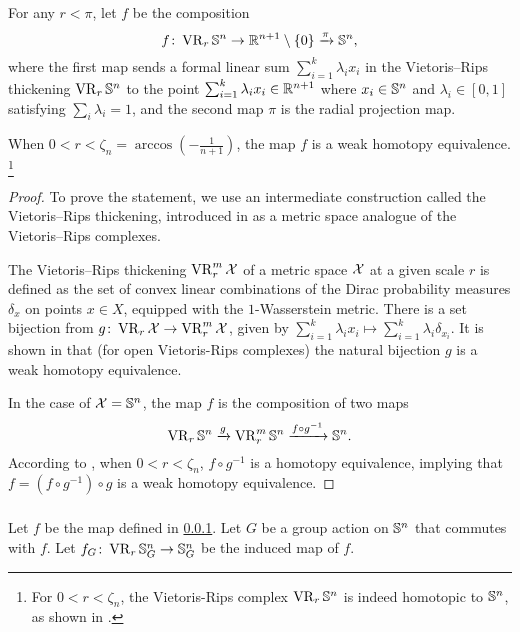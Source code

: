 \subsubsection{}
\label{subsub:f}

For any $r<\pi$, let $f$ be the composition
\[
    f \colon \operatorname{VR}_r\mathbb{S}^n \to \mathbb{R}^{n+1} \setminus \{0\} \xrightarrow{\pi} \mathbb{S}^n,
\]
where the first map sends a formal linear sum $\sum_{i=1}^k \lambda_i x_i$ in the Vietoris--Rips thickening $\operatorname{VR}_r\mathbb{S}^n$ to the point $\sum_{i=1}^k \lambda_i x_i \in \mathbb{R}^{n+1}$ where $x_i \in \mathbb{S}^n$ and $\lambda_i \in [0,1]$ satisfying $\sum_i\lambda_i=1$, and the second map $\pi$ is the radial projection map.

\medskip\lemma
When $0<r<\zeta_n=\arccos{(-\tfrac{1}{n+1})}$, the map $f$ is a weak homotopy equivalence.
\footnote{For $0<r<\zeta_n$, the Vietoris-Rips complex $\operatorname{VR}_r\mathbb{S}^n$ is indeed homotopic to $\mathbb{S}^n$, as shown in \cite[Theorem 7.1]{lim2020vietoris}.}

\begin{proof}
        To prove the statement, we use an intermediate construction called the Vietoris--Rips thickening, introduced in \cite{adamaszek2018metric} as a metric space analogue of the Vietoris--Rips complexes.
        
        The Vietoris--Rips thickening $\operatorname{VR}_r^m\mathcal{X}$ of a metric space $\mathcal{X}$ at a given scale $r$ is defined as the set of convex linear combinations of the Dirac probability measures $\delta_{x}$ on points $x \in X$, equipped with the $1$-Wasserstein metric. 
        There is a set bijection from $g \colon \operatorname{VR}_r\mathcal{X} \to \operatorname{VR}_r^m\mathcal{X}$, given by $\sum_{i=1}^k\lambda_i x_i\mapsto \sum_{i=1}^k\lambda_i\delta_{x_i}.$ 
        It is shown in \cite[Theorem 1]{gillespie2024vietoris} that (for open Vietoris-Rips complexes) the natural bijection $g$ is a weak homotopy equivalence.

        In the case of $\mathcal{X} = \mathbb{S}^n$, the map $f$ is the composition of two maps
        \[\operatorname{VR}_r\mathbb{S}^n\xrightarrow{g}\operatorname{VR}_r^m\mathbb{S}^n\xrightarrow{f \circ g^{-1}}\mathbb{S}^n.\]
        According to \cite[Proposition 5.3]{adamaszek2018metric}, when $0<r<\zeta_n$, $f \circ g^{-1}$ is a homotopy equivalence, implying that $f = (f \circ g^{-1}) \circ g$ is a weak homotopy equivalence.
\end{proof}

\subsubsection{}
\label{subsub:rho}
Let $f$ be the map defined in \cref{subsub:f}.
Let $G$ be a group action on $\mathbb{S}^n$ that commutes with $f$. 
Let $f_G \colon \operatorname{VR}_r\mathbb{S}^n_G \to \mathbb{S}^n_G$ be the induced map of $f$. 

